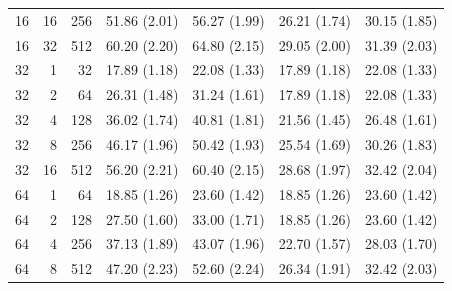 \documentclass{article}
\begin{document}
\begin{table}[!htbp]
\begin{tabular}{@{}rrr rrrr@{}}
16 & 16 & 256 & 51.86 {\scriptsize (2.01)} & 56.27 {\scriptsize (1.99)} & 26.21 {\scriptsize (1.74)} & 30.15 {\scriptsize (1.85)} \\
16 & 32 & 512 & 60.20 {\scriptsize (2.20)} & 64.80 {\scriptsize (2.15)} & 29.05 {\scriptsize (2.00)} & 31.39 {\scriptsize (2.03)} \\
\midrule
32 & 1 & 32 & 17.89 {\scriptsize (1.18)} & 22.08 {\scriptsize (1.33)} & 17.89 {\scriptsize (1.18)} & 22.08 {\scriptsize (1.33)} \\
32 & 2 & 64 & 26.31 {\scriptsize (1.48)} & 31.24 {\scriptsize (1.61)} & 17.89 {\scriptsize (1.18)} & 22.08 {\scriptsize (1.33)} \\
32 & 4 & 128 & 36.02 {\scriptsize (1.74)} & 40.81 {\scriptsize (1.81)} & 21.56 {\scriptsize (1.45)} & 26.48 {\scriptsize (1.61)} \\
32 & 8 & 256 & 46.17 {\scriptsize (1.96)} & 50.42 {\scriptsize (1.93)} & 25.54 {\scriptsize (1.69)} & 30.26 {\scriptsize (1.83)} \\
32 & 16 & 512 & 56.20 {\scriptsize (2.21)} & 60.40 {\scriptsize (2.15)} & 28.68 {\scriptsize (1.97)} & 32.42 {\scriptsize (2.04)} \\
\midrule
64 & 1 & 64 & 18.85 {\scriptsize (1.26)} & 23.60 {\scriptsize (1.42)} & 18.85 {\scriptsize (1.26)} & 23.60 {\scriptsize (1.42)} \\
64 & 2 & 128 & 27.50 {\scriptsize (1.60)} & 33.00 {\scriptsize (1.71)} & 18.85 {\scriptsize (1.26)} & 23.60 {\scriptsize (1.42)} \\
64 & 4 & 256 & 37.13 {\scriptsize (1.89)} & 43.07 {\scriptsize (1.96)} & 22.70 {\scriptsize (1.57)} & 28.03 {\scriptsize (1.70)} \\
64 & 8 & 512 & 47.20 {\scriptsize (2.23)} & 52.60 {\scriptsize (2.24)} & 26.34 {\scriptsize (1.91)} & 32.42 {\scriptsize (2.03)} \\
\bottomrule
\end{tabular}
\end{table}
\end{document}
